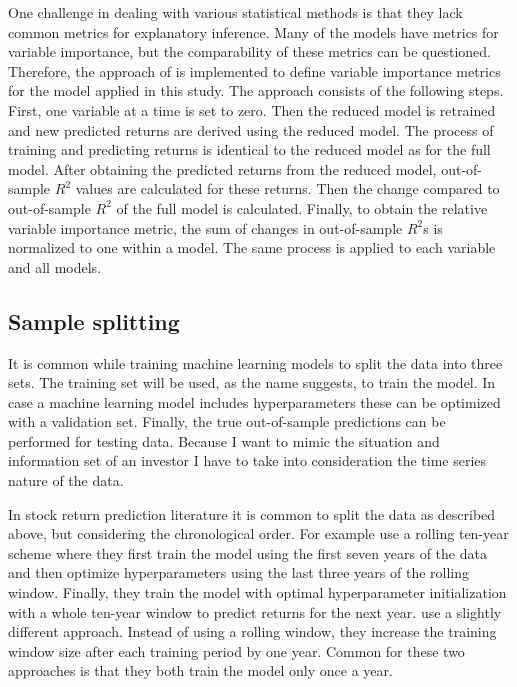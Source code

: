 \documentclass[12pt]{article}
\begin{document}
One challenge in dealing with various statistical methods is that they lack common metrics for explanatory inference. Many of the models have metrics for variable importance, but the comparability of these metrics can be questioned. Therefore, the approach of \citet{guetal} is implemented to define variable importance metrics for the model applied in this study. The approach consists of the following steps. First, one variable at a time is set to zero. Then the reduced model is retrained and new predicted returns are derived using the reduced model. The process of training and predicting returns is identical to the reduced model as for the full model. After obtaining the predicted returns from the reduced model, out-of-sample $R^2$ values are calculated for these returns. Then the change compared to out-of-sample $R^2$ of the full model is calculated. Finally, to obtain the relative variable importance metric, the sum of changes in out-of-sample $R^2$s is normalized to one within a model. The same process is applied to each variable and all models.\footnotemark {} \par

\subsection{Sample splitting} \label{SampleSplitting}

It is common while training machine learning models to split the data into three sets. The training set will be used, as the name suggests, to train the model. In case a machine learning model includes hyperparameters these can be optimized with a validation set. Finally, the true out-of-sample predictions can be performed for testing data. Because I want to mimic the situation and information set of an investor I have to take into consideration the time series nature of the data. \par

In stock return prediction literature it is common to split the data as described above, but considering the chronological order. For example \citet{Fieberg} use a rolling ten-year scheme where they first train the model using the first seven years of the data and then optimize hyperparameters using the last three years of the rolling window.\footnotemark {} Finally, they train the model with optimal hyperparameter initialization with a whole ten-year window to predict returns for the next year. \citet{guetal} use a slightly different approach. Instead of using a rolling window, they increase the training window size after each training period by one year.\footnotemark {} Common for these two approaches is that they both train the model only once a year. \par
\end{document}
